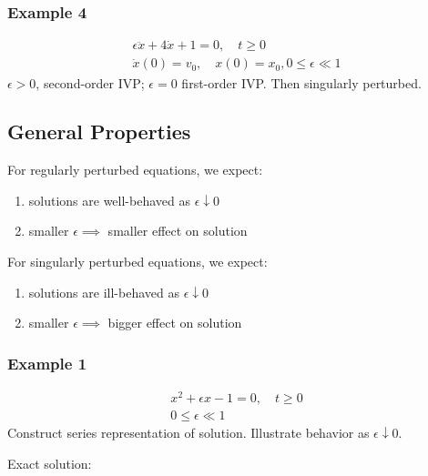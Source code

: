 \documentclass[12pt,twoside]{article}
\begin{document}
\subsubsection{Example 4}
\begin{equation*}
  \begin{aligned}
    \epsilon\ddot{x}+4\dot{x}+1=0,\quad t\ge0 \\
    \dot{x}(0)=v_0,\quad x(0)=x_0,
    0\le\epsilon\ll1
  \end{aligned}
\end{equation*}
$\epsilon>0$, second-order IVP; $\epsilon=0$ first-order IVP. Then singularly
perturbed.

\subsection{General Properties}
For regularly perturbed equations, we expect:
\begin{enumerate}
\item solutions are well-behaved as $\epsilon\downarrow 0$
\item smaller $\epsilon\implies$ smaller effect on solution
\end{enumerate}
For singularly perturbed equations, we expect:
\begin{enumerate}
\item solutions are ill-behaved as $\epsilon\downarrow 0$
\item smaller $\epsilon\implies$ bigger effect on solution
\end{enumerate}

\subsubsection{Example 1}
\begin{equation*}
  \begin{aligned}
    x^2+\epsilon x-1=0,\quad t\ge0 \\
    0\le\epsilon\ll1
  \end{aligned}
\end{equation*}
Construct series representation of solution. Illustrate behavior as
$\epsilon\downarrow 0$.

Exact solution:
\end{document}
